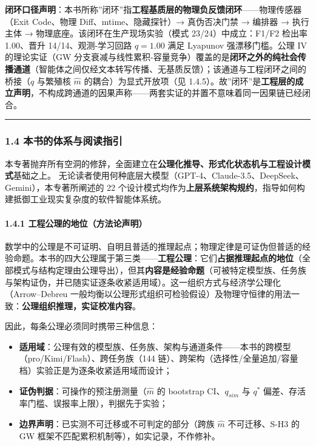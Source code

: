 \textbf{闭环口径声明}：本书所称''闭环''指\textbf{工程基质层的物理负反馈闭环}------物理传感器（Exit
Code、物理 Diff、mtime、隐藏探针）→ 真伪否决门禁 → 编排器 → 执行主体 →
物理底座。该闭环在生产现场实验（模式 23/24）中成立：F1/F2 检出率
1.00、晋升 14/14、观测-学习回路 \(q=1.00\) 满足 Lyapunov
强漂移门槛。公理 IV 的理论实证（GW
分支衰减与线性累积-容量竞争）覆盖的是\textbf{闭环之外的纯社会传播通道}（智能体之间仅经文本转写传播、无基质反馈）；该通道与工程闭环之间的桥接（\(q\)
与繁殖核 \(\hat m\) 的耦合）为显式开放项（见
1.4.5）。故''闭环''是\textbf{工程层的成立声明}，不构成跨通道的因果声称------两套实证的并置不意味着同一因果链已经闭合。

\begin{center}\rule{0.5\linewidth}{0.5pt}\end{center}

\subsubsection{1.4
本书的体系与阅读指引}\label{ux672cux4e66ux7684ux4f53ux7cfbux4e0eux9605ux8bfbux6307ux5f15}

本专著抛弃所有空洞的修辞，全面建立在\textbf{公理化推导、形式化状态机与工程设计模式}基础之上。
无论读者使用何种底层大模型（GPT-4、Claude-3.5、DeepSeek、Gemini），本专著所阐述的
22
个设计模式均作为\textbf{上层系统架构规约}，指导如何构建抵御工业现实复杂度的软件智能体系统。

\paragraph{1.4.1
工程公理的地位（方法论声明）}\label{ux5de5ux7a0bux516cux7406ux7684ux5730ux4f4dux65b9ux6cd5ux8bbaux58f0ux660e}

数学中的公理是不可证明、自明且普适的推理起点；物理定律是可证伪但普适的经验命题。本书的四大公理属于第三类------\textbf{工程公理}：它们\textbf{占据推理起点的地位}（全部模式与结构定理由公理导出），但其\textbf{内容是经验命题}（可被特定模型族、任务族与架构证伪，并已随实证逐条收紧适用域）。这一组织方式与经济学公理化（Arrow--Debreu
一般均衡以公理形式组织可检验假设）及物理守恒律的用法一致：\textbf{公理组织推理，实证校准内容}。

因此，每条公理必须同时携带三种信息：

\begin{itemize}
\tightlist
\item
  \textbf{适用域}：公理有效的模型族、任务族、架构与通道条件------本书的跨模型（pro/Kimi/Flash）、跨任务族（144
  链）、跨架构（选择性/全量追加/容量档）实验正是为逐条收紧适用域而设计；
\item
  \textbf{证伪判据}：可操作的预注册测量（\(\hat m\) 的 bootstrap
  CI、\(q_{sim}\) 与 \(q^*\)
  偏差、存活率门槛、误报率上限），判据先于实验；
\item
  \textbf{边界声明}：已实测不可迁移或不可判定的部分（跨族 \(\hat m\)
  不可迁移、S-H3 的 GW 框架不匹配累积机制等），如实记录，不作修补。
\end{itemize}


